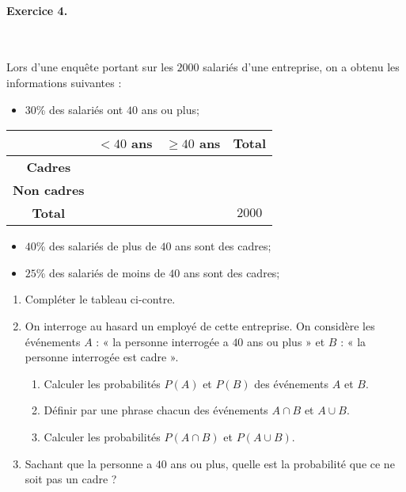 \documentclass[11pt]{article}
\begin{document}
\paragraph{Exercice 4.}~\\
\begin{minipage}{.5\textwidth}
  Lors d'une enquête portant sur les $2000$ salariés d'une entreprise, on a
  obtenu les informations suivantes :
\begin{itemize}
  \item $30$\% des salariés ont $40$ ans ou plus;
\end{itemize}
\end{minipage}
\begin{minipage}{.5\textwidth}
  \begin{center}
 \begin{tabular}{cccc}
  \toprule
  & \textbf{$<40$ ans} & \textbf{$\geq40$ ans} & \textbf{Total} \\
  \midrule
  \textbf{Cadres} &  &  &  \\
  \textbf{Non cadres} &  &  &  \\
  \textbf{Total} &  & & $2000$ \\
  \bottomrule
\end{tabular}
  \end{center}
\end{minipage}
\begin{itemize}
  \item $40$\% des salariés de plus de $40$ ans sont des cadres;
  \item $25$\% des salariés de moins de $40$ ans sont des cadres;
\end{itemize}
\begin{enumerate}
  \item Compléter le tableau ci-contre.
  \item On interroge au hasard un employé de cette entreprise. On considère les
    événements $A$ : « la personne interrogée a $40$ ans ou plus » et $B$ : « la
    personne interrogée est cadre ».
    \begin{enumerate}
      \item Calculer les probabilités $P(A)$ et $P(B)$ des événements $A$ et
        $B$.
      \item Définir par une phrase chacun des événements $A\cap B$ et $A\cup B$.
    \item Calculer les probabilités $P(A\cap B)$ et $P(A\cup B)$.
    \end{enumerate}
  \item Sachant que la personne a $40$ ans ou plus, quelle est la probabilité
    que ce ne soit pas un cadre ?
\end{enumerate}
\end{document}
